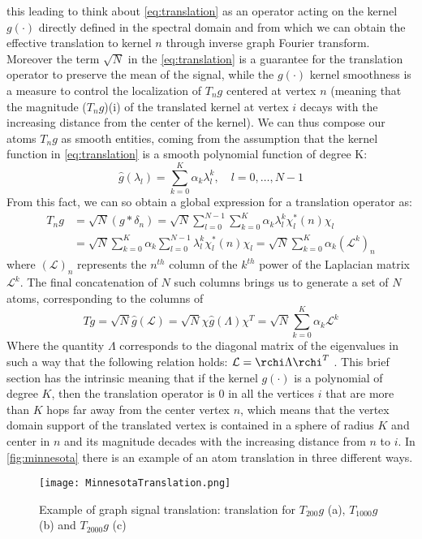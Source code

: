 this leading to think about \ref{eq:translation} as an operator acting on the kernel $g(\cdot)$ directly defined in the spectral domain and from which we can obtain the effective translation to kernel $n$ through inverse graph Fourier transform. Moreover the term $\sqrt{N}$ in the \autoref{eq:translation} is a guarantee for the translation operator to preserve the mean of the signal, while the $g(\cdot)$ kernel smoothness is a measure to control the localization of $T_n g$ centered at vertex $n$ (meaning that the magnitude ($T_n g$)(i) of the translated kernel at vertex $i$ decays with the increasing distance from the center of the kernel). We can thus compose our atoms $T_n g$ as smooth entities, coming from the assumption that the kernel function in \ref{eq:translation} is a smooth polynomial function of degree K:
\begin{equation}
\hat{g}(\lambda_l) = \sum_{k=0}^{K} \alpha_k\lambda_l^k, \quad l = 0,\dots,N-1
\end{equation}
From this fact, we can so obtain a global expression for a translation operator as:
\begin{align}
T_n g & = \sqrt{N}(g * \delta_n) = \sqrt{N}\sum_{l=0}^{N-1}\sum_{k=0}^{K}\alpha_k\lambda_l^k\chi_l^*(n)\chi_l \\
&= \sqrt{N}\sum_{k=0}^{K}\alpha_k\sum_{l=0}^{N-1}\lambda_l^k\chi_l^*(n)\chi_l = \sqrt{N}\sum_{k=0}^{K}\alpha_k (\mathcal{L}^k)_n
\end{align}
where $(\mathcal{L})_n$ represents the $n^{th}$ column of the $k^{th}$ power of the Laplacian matrix $\mathcal{L}^k$. The final concatenation of $N$ such columns brings us to generate a set of $N$ atoms, corresponding to the columns of
\begin{equation}
Tg = \sqrt{N}\hat{g}(\mathcal{L}) = \sqrt{N}\chi \hat{g}(\Lambda)\chi^T = \sqrt{N}\sum_{k=0}^{K}\alpha_k\mathcal{L}^k
\label{eq:tg}
\end{equation}
Where the quantity $\Lambda$ corresponds to the diagonal matrix of the eigenvalues in such a way that the following relation holds: $\mathcal{L} = \rchi \Lambda \rchi^T$ \cite{Dong2016}. This brief section has the intrinsic meaning that if the kernel $g(\cdot)$ is a polynomial of degree $K$, then the translation operator is $0$ in all the vertices $i$ that are more than $K$ hops far away from the center vertex $n$, which means that the vertex domain support of the translated vertex is contained in a sphere of radius $K$ and center in $n$ and its magnitude decades with the increasing distance from $n$ to $i$.
In \autoref{fig:minnesota} there is an example of an atom translation in three different ways.

\begin{figure}
\centering
\texttt{[image: MinnesotaTranslation.png]}
\caption{Example of graph signal translation: translation for $T_{200}g$ (a), $T_{1000}g$ (b) and $T_{2000}g$ (c)}
\label{fig:minnesota}
\end{figure}

